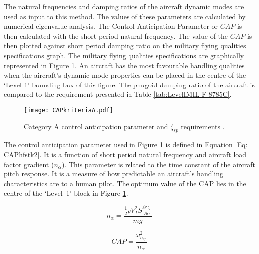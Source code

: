 \documentclass{report}
\begin{document}
The natural frequencies and damping ratios of the aircraft dynamic modes are used as input to this method.  The values of these parameters are calculated by numerical eigenvalue analysis.  The Control Anticipation Parameter or $CAP$ is then calculated with the short period natural frequency.  The value of the $CAP$ is then plotted against short period damping ratio on the military flying qualities specifications graph.  The military flying qualities specifications are graphically represented in Figure \ref{fig: CAPdampRequire}.  An aircraft has the most favourable handling qualities when the aircraft's dynamic mode properties can be placed in the centre of the `Level 1' bounding box of this figure.  The phugoid damping ratio of the aircraft is compared to the requirement presented in Table \ref{tab:LevelIMIL-F-8785C}.

\begin{figure}[htb]
	\begin{center}
		\texttt{[image: CAPkriteriaA.pdf]}
	\end{center}

	\caption{Category A control anticipation parameter and $\zeta_{sp}$ requirements \citep{Wigartikel}.}
	\label{fig: CAPdampRequire}
\end{figure}

The control anticipation parameter used in Figure \ref{fig: CAPdampRequire} is defined in Equation \ref{Eq: CAPhfstk2}.  It is a function of short period natural frequency and aircraft load factor gradient ($n_\alpha$).  This parameter is related to the time constant of the aircraft pitch response.  It is a measure of how predictable an aircraft's handling characteristics are to a human pilot.  The optimum value of the CAP lies in the centre of the \mbox{`Level 1'} block in Figure \ref{fig: CAPdampRequire}.  

\begin{equation}\label{Eq: LoadFactorGradient}
	n_\alpha = \frac{\frac{1}{2} \rho V_T^2 S \frac{\partial C_L}{\partial{\alpha}}}{mg} 	
\end{equation}


\begin{equation}\label{Eq: CAPhfstk2}
	CAP = \frac{\omega_{n_{sp}}^2}{n_\alpha}
\end{equation}

\end{document}

